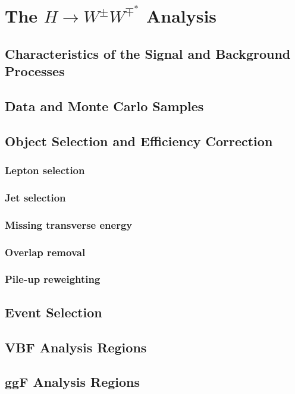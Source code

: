 \chapter{The $H\rightarrow W^{\pm}W^{\mp^*}$ Analysis}
\label{chap:hww}


\section{Characteristics of the Signal and Background Processes}

\section{Data and Monte Carlo Samples}


\section{Object Selection and Efficiency Correction}
\subsection{Lepton selection}
\subsection{Jet selection}
\subsection{Missing transverse energy}
\subsection{Overlap removal}
\label{subsec:overlap-removal}

\subsection{Pile-up reweighting}

\section{Event Selection}
\section{VBF Analysis Regions}
\section{ggF Analysis Regions}

